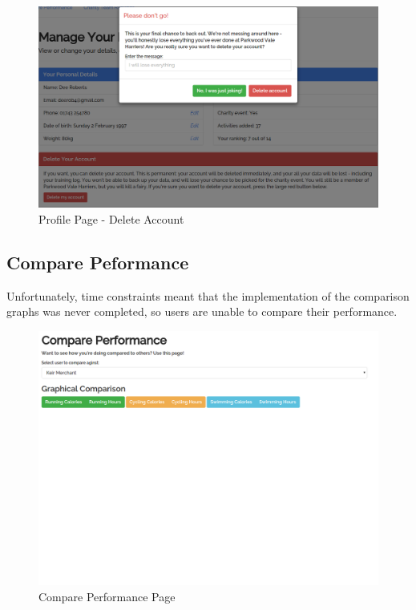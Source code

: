 \documentclass{article}[12pt,a4paper]
\begin{document}
\begin{figure}[h!]
  \includegraphics[scale=0.35]{final_ui/account_delete}
  \caption{Profile Page - Delete Account}
\end{figure}
\clearpage

\subsection{Compare Peformance}
Unfortunately, time constraints meant that the implementation of the comparison graphs was never completed, so users are unable to compare their performance. 

\begin{figure}[h!]
  \includegraphics[scale=0.35]{final_ui/compare_performance}
  \caption{Compare Performance Page}
\end{figure}

\clearpage
\end{document}
